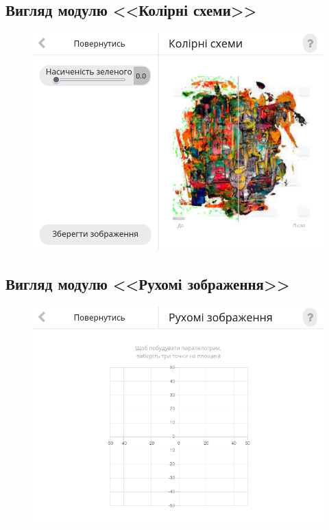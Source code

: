 \documentclass[oneside,14pt]{extarticle}
\begin{document}
\begin{normalsize}
	\subsection{Вигляд модулю <<Колірні схеми>>}
	\begin{figure}[H]
		\centering
		\includegraphics[scale=0.6]{31}
		\caption{}
	\end{figure}
	
	\subsection{Вигляд модулю <<Рухомі зображення>>}
	\begin{figure}[H]
		\centering
		\includegraphics[scale=0.6]{41}
		\caption{}
	\end{figure}
	

\end{normalsize}
\end{document}
